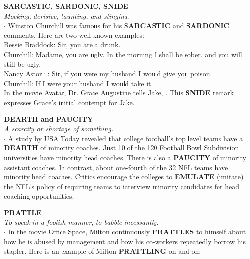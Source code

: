 \documentclass{exam}
\begin{document}
\begin{questions}
\question \textbf{SARCASTIC, SARDONIC, SNIDE}\\ \textit{Mocking, derisive, taunting, and stinging.}\\

$\cdot$ Winston Churchill was famous for his \textbf{SARCASTIC}
and \textbf{SARDONIC} comments. Here are two well-known
examples:\\
Bessie Braddock: Sir, you are a drunk.\\
Churchill: Madame, you are ugly. In the morning I shall be sober, and you will still be ugly.\\
Nancy Astor·: Sir, if you were my husband I would give you poison.\\
Churchill: If I were your husband I would take it.\\
In the movie Avatar, Dr. Grace Augustine tells Jake,
. This \textbf{SNIDE} remark expresses
Grace's initial contempt for Jake.

\question \textbf{DEARTH and PAUCITY}\\ \textit{A scarcity or shortage of something.}\\

$\cdot$ A study by USA Today revealed that college football's top level teams have a \textbf{DEARTH} of minority coaches. Just 10 of the 120 Football Bowl Subdivision
universities have minority head coaches. There is also
a \textbf{PAUCITY} of minority assistant coaches. In contrast,
about one-fourth of the 32 NFL teams have minority
head coaches. Critics encourage the colleges to
\textbf{EMULATE} (imitate) the NFL's policy of requiring
teams to interview minority candidates for head
coaching opportunities.

\question \textbf{PRATTLE}\\ \textit{To speak in a foolish manner, to babble incessantly.}\\

$\cdot$ In the movie Office Space, Milton continuously
\textbf{PRATTLES} to himself about how he is abused by
management and bow his co-workers repeatedly
borrow his stapler. Here is an example of Milton
\textbf{PRATTLING} on and on:\\


\end{questions}
\end{document}
